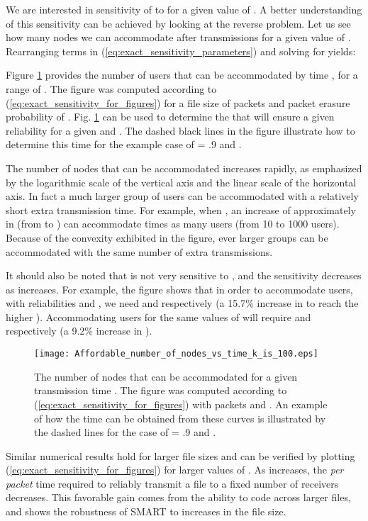 We are interested in sensitivity of  to  for a given value of . A better understanding of this sensitivity can be achieved by looking at the reverse problem. Let us see how many nodes  we can accommodate after  transmissions for a given value of . Rearranging terms in (\ref{eq:exact_sensitivity_parameters}) and solving for  yields: 


Figure \ref{fig:accomodated_nodes_for_a_given_t_k_100} provides the number of users that can be accommodated by time , for a range of . The figure was computed according to (\ref{eq:exact_sensitivity_for_figures}) for a file size of  packets and packet erasure probability of . Fig. \ref{fig:accomodated_nodes_for_a_given_t_k_100} can be used to determine the  that will ensure a given reliability  for a given  and . The dashed black lines in the figure illustrate how to determine this time for the example case of  = .9 and .

The number of nodes  that can be accommodated increases rapidly, as emphasized by the logarithmic scale of the vertical axis and the linear scale of the horizontal axis. In fact a much larger group of users can be accommodated with a relatively short extra transmission time. For example, when , an increase of approximately  in  (from  to ) can accommodate  times as many users (from 10 to 1000 users). Because of the convexity exhibited in the figure, ever larger groups can be accommodated with the same number of extra transmissions. 

It should also be noted that  is not very sensitive to , and the sensitivity decreases as  increases. For example, the figure shows that in order to accommodate  users, with reliabilities  and , we need  and  respectively (a 15.7\% increase in  to reach the higher ). Accommodating  users for the same values of  will require  and  respectively (a 9.2\% increase in ). 
\begin{figure} [ht]
\centering
\texttt{[image: Affordable\_number\_of\_nodes\_vs\_time\_k\_is\_100.eps]}
\vspace{-0.8cm}
\caption{The number of nodes  that can be accommodated for a given transmission time . The figure was computed according to (\ref{eq:exact_sensitivity_for_figures}) with  packets and . An example of how the time  can be obtained from these curves is illustrated by the dashed lines for the case of  = .9 and .}
\label{fig:accomodated_nodes_for_a_given_t_k_100}
\end{figure}

Similar numerical results hold for larger file sizes and can be verified by plotting (\ref{eq:exact_sensitivity_for_figures}) for larger values of . As  increases, the \textit{per packet} time required to reliably transmit a file to a fixed number of receivers decreases. This favorable gain comes from the ability to code across larger files, and shows the robustness of SMART to increases in the file size. 



